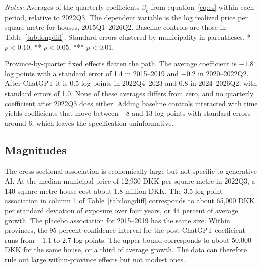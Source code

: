 \documentclass[12pt]{article}
\begin{document}
\begin{table}[t]
\centering
\begin{threeparttable}
\caption{Event-study coefficients averaged by period}\label{tab:es}
\small

\begin{tablenotes}[flushleft]
\footnotesize
\item \textit{Notes:} Averages of the quarterly coefficients $\beta_k$ from equation~\eqref{eq:es} within each period, relative to 2022Q3. The dependent variable is the log realized price per square metre for houses, 2015Q1--2026Q2. Baseline controls are those in Table~\ref{tab:longdiff}. Standard errors clustered by municipality in parentheses. * $p<0.10$, ** $p<0.05$, *** $p<0.01$.
\end{tablenotes}
\end{threeparttable}
\end{table}

Province-by-quarter fixed effects flatten the path. The average coefficient is $-1.8$ log points with a standard error of 1.4 in 2015--2019 and $-0.2$ in 2020--2022Q2. After ChatGPT it is 0.5 log points in 2022Q4--2023 and 0.8 in 2024--2026Q2, with standard errors of 1.0. None of these averages differs from zero, and no quarterly coefficient after 2022Q3 does either. Adding baseline controls interacted with time yields coefficients that move between $-8$ and 13 log points with standard errors around 6, which leaves the specification uninformative.

\subsection{Magnitudes}

The cross-sectional association is economically large but not specific to generative AI. At the median municipal price of 12,930 DKK per square metre in 2022Q3, a 140 square metre house cost about 1.8 million DKK. The 3.5 log point association in column 1 of Table~\ref{tab:longdiff} corresponds to about 65,000 DKK per standard deviation of exposure over four years, or 44 percent of average growth. The placebo association for 2015--2019 has the same size. Within provinces, the 95 percent confidence interval for the post-ChatGPT coefficient runs from $-1.1$ to 2.7 log points. The upper bound corresponds to about 50,000 DKK for the same house, or a third of average growth. The data can therefore rule out large within-province effects but not modest ones.

\end{document}
